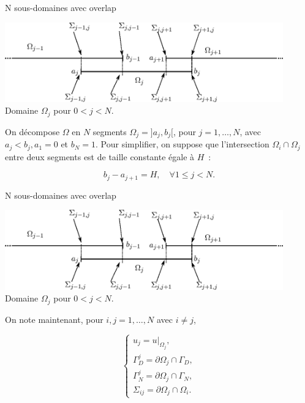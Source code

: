 \documentclass[
mode=present,    %
paper=a4paper,   %
orient=landscape,
display=slides,   %
size=10pt,
style=romain   %
]{powerdot}
\begin{document}
\begin{slide}[toc=N sous-domaines]{N sous-domaines avec overlap}

\begin{center}
 \includegraphics[width=0.9\textwidth]{ndom.eps}\\[1em]
 Domaine $\Omega_{j}$ pour $0<j<N$.
\end{center}

On décompose $\Omega$ en $N$ segments $\Omega_{j} = ]a_{j}, b_{j}[$,
pour $j=1,\ldots, N$, avec $a_{j}<b_{j}, a_{1} = 0$ et $b_{N} = 1$. Pour
simplifier, on suppose que l'intersection $\Omega_{i}\cap\Omega_{j}$
entre deux segments est de taille constante égale à $H$~:

$$
b_{j} - a_{j+1} = H, \quad\forall 1\leq j< N.
$$

\end{slide}

\begin{slide}[toc=]{N sous-domaines avec overlap}

\begin{center}
 \includegraphics[width=0.9\textwidth]{ndom.eps}\\[1em]
 Domaine $\Omega_{j}$ pour $0<j<N$.
\end{center}

On note maintenant, pour $i,j=1,\ldots,N$ avec $i\neq j$,

$$
\begin{cases}
u_{j} = u|_{\Omega_{j}},\\
\Gamma_{D}^{j} = \partial\Omega_{j}\cap\Gamma_{D},\\
\Gamma_{N}^{j} = \partial\Omega_{j}\cap\Gamma_{N},\\
\Sigma_{ij} = \partial\Omega_{j}\cap\Omega_{i}.
\end{cases}
$$
\end{slide}
\end{document}
